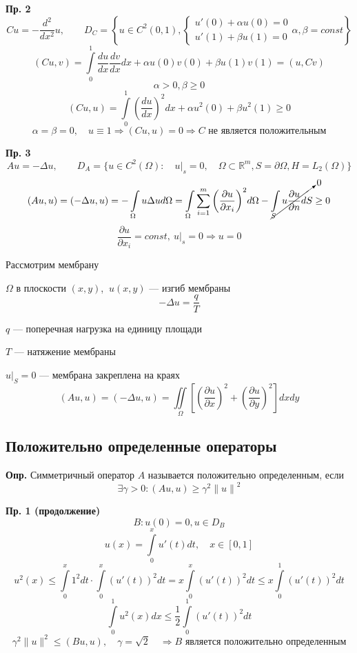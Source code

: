 \documentclass[12pt, a4paper]{article}
\begin{document}
\textbf{Пр. 2}
\[ Cu = - \frac{ d^2 }{dx^2 }u, \qquad D_C = \left\{ u \in C^2(0,1),
	\begin{cases}
		u'(0)+\alpha u(0)=0 \\
		u'(1)+\beta u(1)=0
	\end{cases}
	\alpha, \beta = const
\right\}
\]
\[(Cu, v) = \int\limits_{0}^{1} \frac{du}{dx} \frac{dv}{dx} dx + \alpha u(0)v(0) + \beta u(1)v(1) = (u, Cv)\]
\[\alpha > 0, \beta \geq 0\]
\[(Cu, u) = \int\limits_{0}^{1} {\left(\frac{du}{dx}\right)}^2 dx + \alpha u^2(0) + \beta u^2(1) \geq 0\]
\[\alpha = \beta = 0, \quad u \equiv 1 \Rightarrow (Cu, u) = 0 \Rightarrow C \text{ не является положительным}\]

\textbf{Пр. 3}
\[ Au = - \Delta u , \qquad D_A = \{ u \in C^2(\Omega): \quad u|_s = 0, \quad \Omega \subset \mathbb{R}^m, S = \partial \Omega, H = L_2(\Omega) \} \]
\[ (Au, u) = (-\Delta u, u ) = - \int\limits_{\Omega }^{} u \Delta u d \Omega = \int\limits_{\Omega }^{} \sum_{i = 1}^{m } {\left(\frac{\partial u }{\partial x_i }\right)}^2 d\Omega - \cancelto{0}{\int\limits_{S }^{} u \frac{\partial u }{\partial n } dS}  \geq 0 \]
\[ \frac{\partial u }{\partial x_i } = const, \ u|_s = 0 \Rightarrow u = 0 \] 

\newpage

Рассмотрим мембрану

$\Omega$ в плоскости $(x,y)$, $\ u(x,y)$ --- изгиб мембраны
\[ - \Delta u = \frac{q}{T} \]

$q$ --- поперечная нагрузка на единицу площади

$T$ --- натяжение мембраны

$ {u|}_S = 0 $ --- мембрана закреплена на краях
\[ (A u , u) = (- \Delta u , u) = \iint\limits_{\Omega} \left[ \left(\frac{\partial u }{\partial x }\right)^2 + \left(\frac{ \partial u }{\partial y }\right)^2 \right] dx dy  \]

\subsection{Положительно определенные операторы}

\textbf{Опр.} Симметричный оператор $A$ называется положительно определенным, если 
\begin{equation}
	\exists \gamma > 0 : (Au, u) \geq \gamma^2 {\|u\|}^2
\end{equation}

\textbf{Пр. 1 (продолжение)}
\[ B: u(0) = 0, u \in D_B \]
\[ u(x) = \int\limits_{0}^{x } u'(t) dt, \quad x \in [0, 1] \]
\[ u^2(x) \leq \int\limits_{0}^{x} 1^2 dt \cdot \int\limits_{0}^{x} {(u'(t))}^2 dt = x \int\limits_{0}^{x} {(u'(t))}^2 dt \leq x \int\limits_{0}^{1} {(u'(t))}^2 dt \]
\[ \int\limits_{0}^{1} u^2 (x) dx \leq \frac{1}{2} \int\limits_{0}^{1} {(u'(t))}^2 dt \]
\[ \gamma^2 \|u\|^2 \leq (Bu, u) , \quad \gamma = \sqrt{2} \quad \Rightarrow B \text{ является положительно определенным} \]
\end{document}
